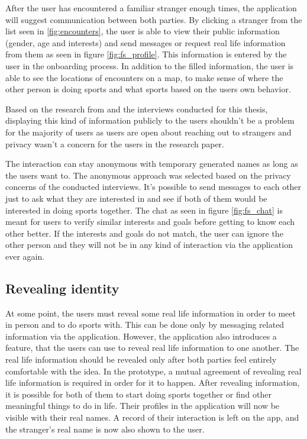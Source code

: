 After the user has encountered a familiar stranger enough times, the application will suggest communication between both parties. By clicking a stranger from the list seen in \ref{fig:encounters}, the user is able to view their public information (gender, age and interests) and send messages or request real life information from them as seen in figure \ref{fig:fs_profile}. This information is entered by the user in the onboarding process. In addition to the filled information, the user is able to see the locations of encounters on a map, to make sense of where the other person is doing sports and what sports based on the users own behavior.

Based on the  research from \cite{socialAdHoc} and the interviews conducted for this thesis, displaying this kind of information publicly to the users shouldn't be a problem for the majority of users as users are open about reaching out to strangers and privacy wasn't a concern for the users in the research paper.

The interaction can stay anonymous with temporary generated names as long as the users want to. The anonymous approach was selected based on the privacy concerns of the conducted interviews. It's possible to send messages to each other just to ask what they are interested in and see if both of them would be interested in doing sports together. The chat as seen in figure \ref{fig:fs_chat} is meant for users to verify similar interests and goals before getting to know each other better. If the interests and goals do not match, the user can ignore the other person and they will not be in any kind of interaction via the application ever again.

\subsection{Revealing identity}

At some point, the users must reveal some real life information in order to meet in person and to do sports with. This can be done only by messaging related information via the application. However, the application also introduces a feature, that the users can use to reveal real life information to one another. The real life information should be revealed only after both parties feel entirely comfortable with the idea. In the prototype, a mutual agreement of revealing real life information is required in order for it to happen. After revealing information, it is possible for both of them to start doing sports together or find other meaningful things to do in life. Their profiles in the application will now be visible with their real names. A record of their interaction is left on the app, and the stranger's real name is now also shown to the user.
\clearpage

